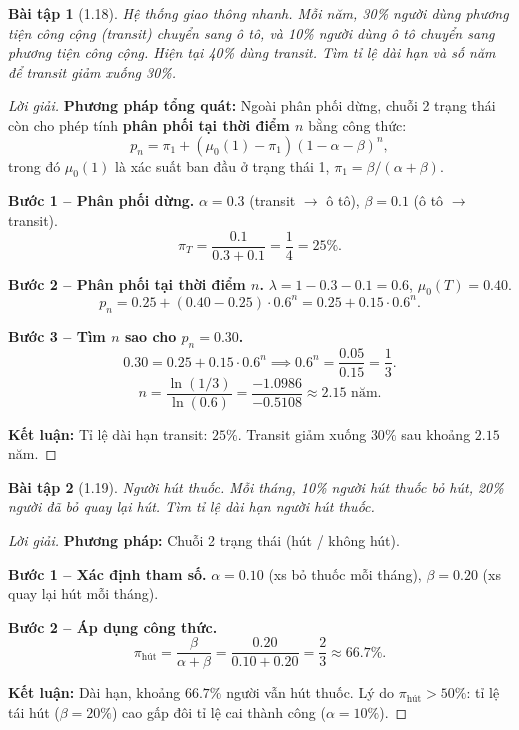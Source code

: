 \documentclass[8pt,a4paper]{article}
\newtheorem{exercise}{Bài tập}
\newenvironment{solution}{\begin{proof}[Lời giải]}{\end{proof}}
\begin{document}
\begin{exercise}[1.18]
Hệ thống giao thông nhanh. Mỗi năm, 30\% người dùng phương tiện công cộng (transit) chuyển sang ô tô, và 10\% người dùng ô tô chuyển sang phương tiện công cộng. Hiện tại 40\% dùng transit. Tìm tỉ lệ dài hạn và số năm để transit giảm xuống 30\%.
\end{exercise}
\begin{solution}
\textbf{Phương pháp tổng quát:} Ngoài phân phối dừng, chuỗi 2 trạng thái còn cho phép tính \textbf{phân phối tại thời điểm $n$} bằng công thức:
\[
  p_n = \pi_1 + (\mu_0(1) - \pi_1)(1-\alpha-\beta)^n,
\]
trong đó $\mu_0(1)$ là xác suất ban đầu ở trạng thái 1, $\pi_1 = \beta/(\alpha+\beta)$.

\textbf{Bước 1 -- Phân phối dừng.}
$\alpha = 0.3$ (transit $\to$ ô tô), $\beta = 0.1$ (ô tô $\to$ transit).
\[
  \pi_T = \frac{0.1}{0.3+0.1} = \frac{1}{4} = 25\%.
\]

\textbf{Bước 2 -- Phân phối tại thời điểm $n$.}
$\lambda = 1 - 0.3 - 0.1 = 0.6$, $\mu_0(T) = 0.40$.
\[
  p_n = 0.25 + (0.40 - 0.25) \cdot 0.6^n = 0.25 + 0.15 \cdot 0.6^n.
\]

\textbf{Bước 3 -- Tìm $n$ sao cho $p_n = 0.30$.}
\[
  0.30 = 0.25 + 0.15 \cdot 0.6^n \implies 0.6^n = \frac{0.05}{0.15} = \frac{1}{3}.
\]
\[
  n = \frac{\ln(1/3)}{\ln(0.6)} = \frac{-1.0986}{-0.5108} \approx 2.15 \text{ năm}.
\]

\textbf{Kết luận:} Tỉ lệ dài hạn transit: $25\%$. Transit giảm xuống $30\%$ sau khoảng $2.15$ năm.
\end{solution}

\begin{exercise}[1.19]
Người hút thuốc. Mỗi tháng, 10\% người hút thuốc bỏ hút, 20\% người đã bỏ quay lại hút. Tìm tỉ lệ dài hạn người hút thuốc.
\end{exercise}
\begin{solution}
\textbf{Phương pháp:} Chuỗi 2 trạng thái (hút / không hút).

\textbf{Bước 1 -- Xác định tham số.}
$\alpha = 0.10$ (xs bỏ thuốc mỗi tháng), $\beta = 0.20$ (xs quay lại hút mỗi tháng).

\textbf{Bước 2 -- Áp dụng công thức.}
\[
  \pi_{\text{hút}} = \frac{\beta}{\alpha+\beta} = \frac{0.20}{0.10+0.20} = \frac{2}{3} \approx 66.7\%.
\]

\textbf{Kết luận:} Dài hạn, khoảng $66.7\%$ người vẫn hút thuốc. Lý do $\pi_{\text{hút}} > 50\%$: tỉ lệ tái hút ($\beta = 20\%$) cao gấp đôi tỉ lệ cai thành công ($\alpha = 10\%$).
\end{solution}
\end{document}
